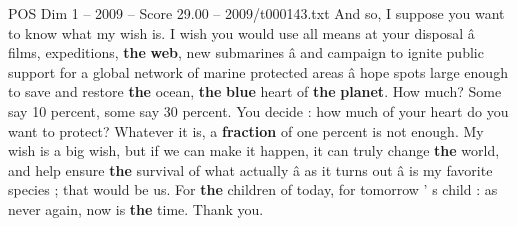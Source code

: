\begin{textsample}{POS Dim 1 – 2009 – Score 29.00 – 2009/t000143.txt}
And so, I suppose you want to know what my wish is.
I wish you would use all means at your disposal â films, expeditions, \textbf{the} \textbf{web}, new submarines â and campaign to ignite public support for a global network of marine protected areas â hope spots large enough to save and restore \textbf{the} ocean, \textbf{the} \textbf{blue} heart of \textbf{the} \textbf{planet}.
How much?
Some say 10 percent, some say 30 percent.
You decide : how much of your heart do you want to protect?
Whatever it is, a \textbf{fraction} of one percent is not enough.
My wish is a big wish, but if we can make it happen, it can truly change \textbf{the} world, and help ensure \textbf{the} survival of what actually â as it turns out â is my favorite species ; that would be us.
For \textbf{the} children of today, for tomorrow ' s child : as never again, now is \textbf{the} time.
Thank you.

\end{textsample}
